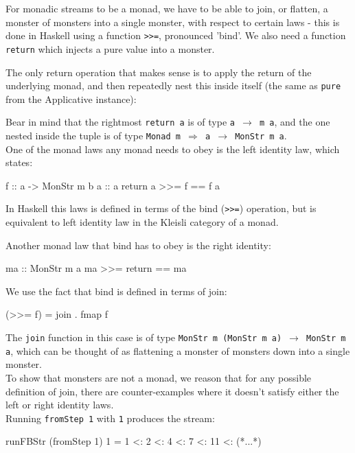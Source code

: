 For monadic streams to be a monad, we have to be able to join, or flatten, a monster of monsters into a single monster, with respect to certain laws - this is done in Haskell using a function \verb+>>=+, pronounced 'bind'. We also need a function \verb+return+ which injects a pure value into a monster.

The only return operation that makes sense is to apply the return of the underlying monad, and then repeatedly nest this inside itself (the same as \verb+pure+ from the Applicative instance):
Bear in mind that the rightmost \verb+return a+ is of type \texttt{a $\to$ m a}, and the one nested inside the tuple is of type \texttt{Monad m $\Rightarrow$ a $\to$ MonStr m a}. \\

One of the monad laws any monad needs to obey is the left identity law, which states: 
\begin{haskell}
f :: a -> MonStr m b
a :: a
return a  >>=  f == f a
\end{haskell}
In Haskell this laws is defined in terms of the bind (\verb+>>=+) operation, but is equivalent to left identity law in the Kleisli category of a monad.

Another monad law that bind has to obey is the right identity:
\begin{haskell}
ma :: MonStr m a
ma  >>= return == ma
\end{haskell}

We use the fact that bind is defined in terms of join:
\begin{haskell}
(>>= f) = join . fmap f 
\end{haskell}
The \verb+join+ function in this case is of type \texttt{MonStr m (MonStr m a) $\to$ MonStr m a}, which can be thought of as flattening a monster of monsters down into a single monster. \\

To show that monsters are not a monad, we reason that for any possible definition of join, there are counter-examples where it doesn't satisfy either the left or right identity laws.\\

Running \verb+fromStep 1+ with \verb+1+ produces the stream:
\begin{haskell}
runFBStr (fromStep 1) 1 = 1 <: 2 <: 4 <: 7 <: 11 <: (*...*)
\end{haskell}

